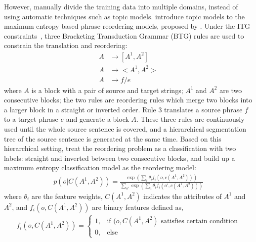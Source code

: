 However, \citet{Chen-2013} manually divide the training data into multiple domains, instead of using automatic techniques such as topic models. \citet{wang-14} introduce topic models to the maximum entropy based phrase reordering models, proposed by \citet{Xiong-2006}. Under the ITG constraints~\citep{Wu-1997}, three Bracketing Transduction Grammar (BTG) rules are used to constrain the translation and reordering:
\begin{align}
A &\rightarrow [A^1, A^2]\\
A &\rightarrow <A^1, A^2>\\
A &\rightarrow f/e
\end{align}
where $A$ is a block with a pair of source and target strings; $A^1$ and $A^2$ are two consecutive blocks; the two rules are reordering rules which merge two blocks into a larger block in a straight or inverted order. Rule 3 translates a source phrase $f$ to a target phrase $e$ and generate a block $A$. These three rules are continuously used until the whole source sentence is covered, and a hierarchical segmentation tree of the source sentence is generated at the same time. Based on this hierarchical setting, \citet{Xiong-2006} treat the reordering problem as a classification with two labels: straight and inverted between two consecutive blocks, and build up a maximum entropy classification model as the reordering model:
\begin{align}
p(o|C(A^1, A^2)) = \frac{\exp(\sum_i \theta_i f_i(o, c(A^1, A^2)))}{\sum_{o'} \exp(\sum_i \theta_i f_i(o', c(A^1, A^2)))}
\end{align}
where $\theta_i$ are the feature weights, $C(A^1, A^2)$ indicates the attributes of $A^1$ and $A^2$, and $f_i(o, C(A^1, A^2))$ are binary features defined as,
\begin{align}
f_i(o, C(A^1,A^2)) = \begin{cases}
1, &\text{if $(o,C(A^1, A^2)$ satisfies certain condition} \\
0, &\text{else}
\end{cases}
\end{align}

